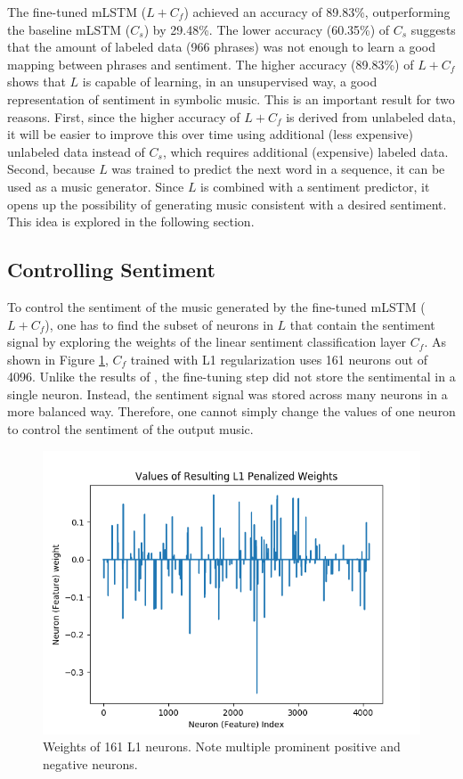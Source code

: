 The fine-tuned mLSTM ($L + C_f$) achieved an accuracy of 89.83\%, outperforming the baseline mLSTM ($C_s$) by 29.48\%. The lower accuracy (60.35\%) of $C_s$ suggests that the amount of labeled data (966 phrases) was not enough to learn a good mapping between phrases and sentiment. The higher accuracy (89.83\%) of $L + C_f$ shows that $L$ is capable of learning, in an unsupervised way, a good representation of sentiment in symbolic music. This is an important result for two reasons. First, since the higher accuracy of $L + C_f$ is derived from unlabeled data, it will be easier to improve this over time using additional (less expensive) unlabeled data instead of $C_s$, which requires additional (expensive) labeled data. Second, because $L$ was trained to predict the next word in a sequence, it can be used as a music generator. Since $L$ is combined with a sentiment predictor, it opens up the possibility of generating music consistent with a desired sentiment. This idea is explored in the following section.

\subsection{Controlling Sentiment}

To control the sentiment of the music generated by the fine-tuned mLSTM ($L + C_f$), one has to find the subset of neurons in $L$ that contain the sentiment signal by exploring the weights of the linear sentiment classification layer $C_f$. As shown in Figure \ref{fig:final_weights}, $C_f$ trained with L1 regularization uses 161 neurons out of 4096. Unlike the results of \citet{radford_2017}, the fine-tuning step did not store the sentimental in a single neuron. Instead, the sentiment signal was stored across many neurons in a more balanced way. Therefore, one cannot simply change the values of one neuron to control the sentiment of the output music.

\begin{figure}[!h]
 \centering
 \includegraphics[width=\columnwidth]{imgs/ismir19/weights.png}
 \caption{Weights of 161 L1 neurons. Note multiple prominent positive and negative neurons.}
 \label{fig:final_weights}
\end{figure}

